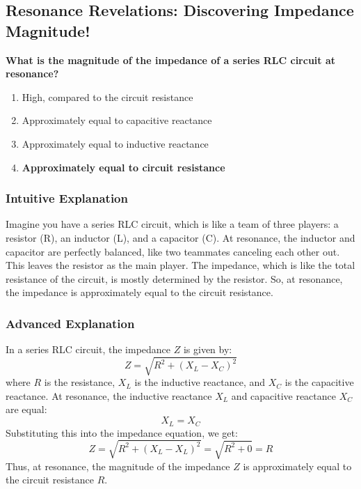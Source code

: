 \subsection{Resonance Revelations: Discovering Impedance Magnitude!}

\begin{tcolorbox}[colback=gray!10!white,colframe=black!75!black,title=\textbf{E5A03}]
\textbf{What is the magnitude of the impedance of a series RLC circuit at resonance?}
\begin{enumerate}[label=\Alph*.]
    \item High, compared to the circuit resistance
    \item Approximately equal to capacitive reactance
    \item Approximately equal to inductive reactance
    \item \textbf{Approximately equal to circuit resistance}
\end{enumerate}
\end{tcolorbox}

\subsubsection{Intuitive Explanation}
Imagine you have a series RLC circuit, which is like a team of three players: a resistor (R), an inductor (L), and a capacitor (C). At resonance, the inductor and capacitor are perfectly balanced, like two teammates canceling each other out. This leaves the resistor as the main player. The impedance, which is like the total resistance of the circuit, is mostly determined by the resistor. So, at resonance, the impedance is approximately equal to the circuit resistance.

\subsubsection{Advanced Explanation}
In a series RLC circuit, the impedance \( Z \) is given by:
\[
Z = \sqrt{R^2 + (X_L - X_C)^2}
\]
where \( R \) is the resistance, \( X_L \) is the inductive reactance, and \( X_C \) is the capacitive reactance. At resonance, the inductive reactance \( X_L \) and capacitive reactance \( X_C \) are equal:
\[
X_L = X_C
\]
Substituting this into the impedance equation, we get:
\[
Z = \sqrt{R^2 + (X_L - X_L)^2} = \sqrt{R^2 + 0} = R
\]
Thus, at resonance, the magnitude of the impedance \( Z \) is approximately equal to the circuit resistance \( R \).

